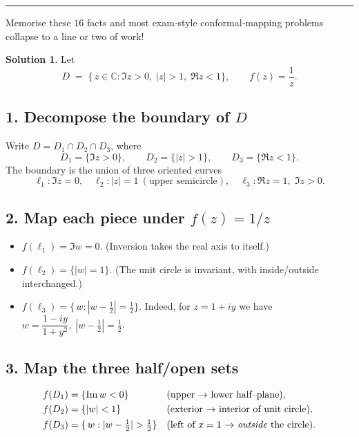 \documentclass[12pt]{article}
\theoremstyle{definition} %
\newtheorem{solution}{Solution}
\theoremstyle{plain} %
\begin{document}
 \vspace{1em}
 \hrule
 \centerline{\small * Memorise these \(16\) facts and most exam‐style
 conformal‐mapping problems collapse to a line or two of work!}
 \pagebreak
 \begin{solution}
   Let
   \[
     D \;=\;
     \bigl\{\,z\in\mathbb{C} : \Im z>0,\; |z|>1,\;\Re z<1\bigr\},
     \qquad
     f(z)=\frac1z .
   \]
   
   \subsection*{1.  Decompose the boundary of \(D\)}
   Write \(D=D_{1}\cap D_{2}\cap D_{3}\), where
   \[
     \boxed{D_{1}}=\{\Im z>0\},\qquad
     \boxed{D_{2}}=\{|z|>1\},\qquad
     \boxed{D_{3}}=\{\Re z<1\}.
   \]
   The boundary is the union of three oriented curves
   \[
     \ell_{1}: \Im z=0,\quad
     \ell_{2}: |z|=1\ (\text{upper semicircle}),\quad
     \ell_{3}: \Re z=1,\; \Im z>0.
   \]
   
   \subsection*{2.  Map each piece under \(f(z)=1/z\)}
   \begin{itemize}
     \item \(\displaystyle f(\ell_{1})=\Im w=0.\)
           (Inversion takes the real axis to itself.)
     \item \(\displaystyle f(\ell_{2})=\{|w|=1\}.\)
           (The unit circle is invariant, with inside/outside interchanged.)
     \item \(\displaystyle f(\ell_{3})=\bigl\{\,w:|w-\tfrac12|=\tfrac12\bigr\}.\)
           Indeed, for \(z=1+iy\) we have
           \(
             w=\dfrac{1-iy}{1+y^{2}},\;
             |w-\tfrac12|=\tfrac12
           \).
   \end{itemize}
   
   \subsection*{3.  Map the three half/open sets}
   \[
     \begin{aligned}
       f(D_{1})&=\{\Im w<0\}
         &&\text{(upper $\to$ lower half--plane)},\\
       f(D_{2})&=\{|w|<1\}
         &&\text{(exterior $\to$ interior of unit circle)},\\
       f(D_{3})&=\{\,w:|w-\tfrac12|>\tfrac12\}
         &&\text{(left of \(x=1\) $\to$ \emph{outside} the circle)}.
     \end{aligned}
   \]
   

\end{solution}
\end{document}
